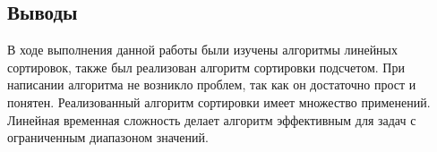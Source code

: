\documentclass[12pt]{article}
\begin{document}
\subsection*{Выводы}

В ходе выполнения данной работы были изучены алгоритмы линейных сортировок, также был реализован алгоритм сортировки подсчетом. При написании алгоритма не возникло проблем, так как он достаточно прост и понятен. Реализованный алгоритм сортировки имеет множество применений. Линейная временная сложность делает алгоритм эффективным для задач с ограниченным диапазоном значений.
\end{document}
